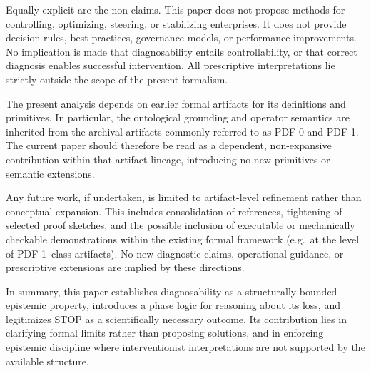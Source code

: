 Equally explicit are the non-claims.
This paper does not propose methods for controlling, optimizing, steering, or
stabilizing enterprises.
It does not provide decision rules, best practices, governance models, or
performance improvements.
No implication is made that diagnosability entails controllability, or that
correct diagnosis enables successful intervention.
All prescriptive interpretations lie strictly outside the scope of the present
formalism.

The present analysis depends on earlier formal artifacts for its definitions
and primitives.
In particular, the ontological grounding and operator semantics are inherited
from the archival artifacts commonly referred to as PDF-0 and PDF-1.
The current paper should therefore be read as a dependent, non-expansive
contribution within that artifact lineage, introducing no new primitives or
semantic extensions.

Any future work, if undertaken, is limited to artifact-level refinement rather
than conceptual expansion.
This includes consolidation of references, tightening of selected proof
sketches, and the possible inclusion of executable or mechanically checkable
demonstrations within the existing formal framework (e.g.\ at the level of
PDF-1--class artifacts).
No new diagnostic claims, operational guidance, or prescriptive extensions are
implied by these directions.

In summary, this paper establishes diagnosability as a structurally bounded
epistemic property, introduces a phase logic for reasoning about its loss, and
legitimizes STOP as a scientifically necessary outcome.
Its contribution lies in clarifying formal limits rather than proposing
solutions, and in enforcing epistemic discipline where interventionist
interpretations are not supported by the available structure.
